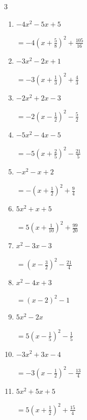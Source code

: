 \begin{multicols}{3}
\begin{enumerate}
        $\displaystyle =2\left( x-\frac{5}{4}\right)^{2}-\frac{41}{8}$

  \item $-4x^{2}-5x+5$

        $\displaystyle =-4\left( x+\frac{5}{8}\right)^{2}+\frac{105}{16}$

\columnbreak %

  \item $-3x^{2}-2x+1$

        $\displaystyle =-3\left( x+\frac{1}{3}\right)^{2}+\frac{4}{3}$

  \item $-2x^{2}+2x-3$

        $\displaystyle =-2\left( x-\frac{1}{2}\right)^{2}-\frac{5}{2}$

  \item $-5x^{2}-4x-5$

        $\displaystyle =-5\left( x+\frac{2}{5}\right)^{2}-\frac{21}{5}$

  \item $-x^{2}-x+2$

        $\displaystyle =-\left( x+\frac{1}{2}\right)^{2}+\frac{9}{4}$

  \item $5x^{2}+x+5$

        $\displaystyle =5\left( x+\frac{1}{10}\right)^{2}+\frac{99}{20}$

\columnbreak %

\resetques

  \item $x^{2}-3x-3$

        $\displaystyle =\left( x-\frac{3}{2}\right)^{2}-\frac{21}{4}$

  \item $x^{2}-4x+3$

        $\displaystyle =\left( x-2\right)^{2}-1$

  \item $5x^{2}-2x$

        $\displaystyle =5\left( x-\frac{1}{5}\right)^{2}-\frac{1}{5}$

  \item $-3x^{2}+3x-4$

        $\displaystyle =-3\left( x-\frac{1}{2}\right)^{2}-\frac{13}{4}$

  \item $5x^{2}+5x+5$

        $\displaystyle =5\left( x+\frac{1}{2}\right)^{2}+\frac{15}{4}$


\end{enumerate}
\end{multicols}

